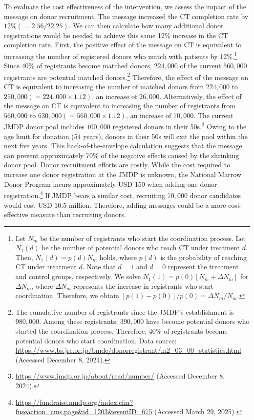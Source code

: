 \documentclass[12pt, a4paper]{article}
\newcommand{\revise}[1]{{\color{red}{#1}}}
\begin{document}
To evaluate the cost effectiveness of the intervention, we assess the impact of the \revise{matching difficulty} message on donor recruitment. The \revise{matching difficulty} message increased the CT completion rate by \(12\% (= 2.56/22.25)\). We can then calculate how many additional donor registrations would be needed to achieve this same 12\% increase in the CT completion rate. First, the positive effect of the \revise{matching difficulty} message on CT is equivalent to increasing the number of registered donors who match with patients by 12\%.\footnote{Let \(N_m\) be the number of registrants who start the coordination process. Let \(N_1(d)\) be the number of potential donors who reach CT under treatment \(d\). Then, \(N_1(d) = p(d)N_m\) holds, where \(p(d)\) is the probability of reaching CT under treatment \(d\). Note that \(d = 1\) and \(d = 0\) represent the treatment and control groups, respectively. We solve \(N_1(1) = p(0)[N_m + \Delta N_m]\) for \(\Delta N_m\), where \(\Delta N_m\) represents the increase in registrants who start coordination. Therefore, we obtain \([p(1) - p(0)]/p(0) = \Delta N_m/N_m\).} Since 40\% of registrants become matched donors, \(224,000\) of the current \(560,000\) registrants are potential matched donors.\footnote{The cumulative number of registrants since the JMDP's establishment is \(980,000\). Among these registrants, \(390,000\) have become potential donors who started the coordination process. Therefore, 40\% of registrants become potential donors who start coordination. Data source: \url{https://www.bs.jrc.or.jp/bmdc/donorregistrant/m2_03_00_statistics.html} (Accessed December 8, 2024).} Therefore, the effect of the \revise{matching difficulty} message on CT is equivalent to increasing the number of matched donors from \(224,000\) to \(250,000 (= 224,000 \times 1.12)\), an increase of \(26,000\). Alternatively, the effect of the \revise{matching difficulty} message on CT is equivalent to increasing the number of registrants from \(560,000\) to \(630,000 (= 560,000 \times 1.12)\), an increase of \(70,000\). The current JMDP donor pool includes \(100,000\) registered donors in their 50s.\footnote{\url{https://www.jmdp.or.jp/about/read/number/} (Accessed December 8, 2024).} Owing to the age limit for donation (54 years), donors in their 50s will exit the pool within the next five years. This back-of-the-envelope calculation suggests that the \revise{matching difficulty} message can prevent approximately 70\% of the negative effects caused by the shrinking donor pool. Donor recruitment efforts are costly. While the cost required to increase one donor registration at the JMDP is unknown, the National Marrow Donor Program incurs approximately USD 150 when adding one donor registration.\footnote{\url{https://fundraise.nmdp.org/index.cfm?fuseaction=cms.page\&id=1203\&eventID=675} (Accessed March 29, 2025).} If JMDP bears a similar cost, recruiting \(70,000\) donor candidates would cost USD \(10.5\) million. Therefore, adding messages could be a more cost-effective measure than recruiting donors.
\end{document}

